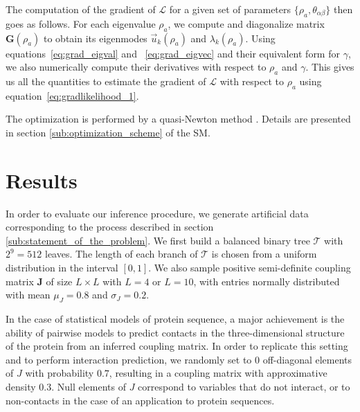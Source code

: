 \documentclass[preprint,amsmath,amssymb,superscriptaddress,showpacs,pre]{revtex4-1}
\begin{document}
The computation of the gradient of $\mathcal{L}$ for a given set of parameters $\{\rho_a, \theta_{\alpha\beta}\}$ then goes as follows. 
For each eigenvalue $\rho_a$, we compute and diagonalize matrix $\bm{G}(\rho_a)$ to obtain its eigenmodes $\vec{u}_k(\rho_a)$ and $\lambda_k(\rho_a)$. 
Using equations~\eqref{eq:grad_eigval} and ~\eqref{eq:grad_eigvec} and their equivalent form for $\gamma$, we also numerically compute their derivatives with respect to $\rho_a$ and $\gamma$. 
This gives us all the quantities to estimate the gradient of $\mathcal{L}$ with respect to $\rho_a$ using equation~\eqref{eq:gradlikelihood_1}.

 The optimization is performed by a quasi-Newton method \cite{NLopt}. Details are presented in section \ref{sub:optimization_scheme} of the SM. 




\section{Results}
\label{sec:Results}

In order to evaluate our inference procedure, we generate artificial data corresponding to the process described in section \ref{sub:statement_of_the_problem}. 
We first build a  balanced binary tree $\mathcal{T}$ with $2^9=512$ leaves. 
The length of each branch of $\mathcal{T}$ is chosen from a uniform distribution in the interval $[0,1]$. 
We also sample positive semi-definite coupling matrix $\bm{J}$ of size $L\times L$ with $L=4$ or $L=10$, with entries normally distributed with mean $\mu_J=0.8$ and $\sigma_J=0.2$. 

In the case of statistical models of protein sequence, a major achievement is the ability of pairwise models to predict contacts in the three-dimensional structure of the protein from an inferred coupling matrix.
In order to replicate this setting and to perform interaction prediction, we randomly set to $0$ off-diagonal elements of $J$ with probability $0.7$, resulting in a coupling matrix with approximative density $0.3$.  
Null elements of $J$ correspond to variables that do not interact, or to non-contacts in the case of an application to protein sequences.  
\end{document}

